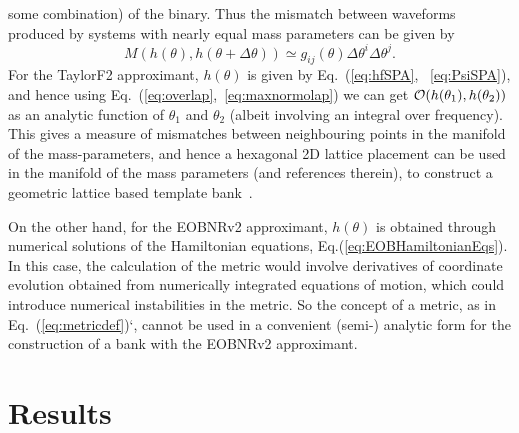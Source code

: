 some combination) of the binary. Thus the mismatch between waveforms produced by systems with nearly equal mass parameters can be given by
\begin{equation}
 M(h(\theta),h(\theta + \Delta\theta)) \simeq g_{ij}(\theta)\Delta\theta^i\Delta\theta^j.
\end{equation}
For the TaylorF2 approximant, $h(\theta)$ is given by Eq.~(\ref{eq:hfSPA},
~\ref{eq:PsiSPA}), and hence using Eq.~(\ref{eq:overlap},~\ref{eq:maxnormolap}) we 
can get $\mathcal{O}(h(\theta_1),h(\theta_2))$ as an analytic function of $\theta_1$ 
and $\theta_2$ (albeit involving an integral over frequency).
This gives a measure of mismatches between neighbouring points in the manifold 
of the mass-parameters, and hence a hexagonal 2D lattice placement can be used 
in the manifold of the mass parameters \cite{SathyaMetric2PN} (and references therein), 
to construct a geometric lattice based template bank~\cite{SathyaBankPlacementTauN,OwenTemplateSpacing,SathyaMetric2PN}. 
 
On the other hand, for the EOBNRv2 approximant, $h(\theta)$ is obtained through 
numerical solutions of the Hamiltonian equations, Eq.(\ref{eq:EOBHamiltonianEqs}). 
In this case, the calculation of the metric would involve derivatives of coordinate
evolution obtained from numerically integrated equations of motion, 
which could introduce numerical instabilities in the metric. So the concept of 
a metric, as in Eq.~(\ref{eq:metricdef})`, cannot be used in a convenient (semi-) 
analytic form for the construction of a bank with the EOBNRv2 approximant.

\section{Results}
\label{s:results}

